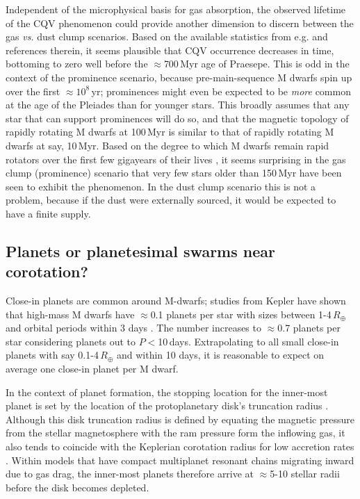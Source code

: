 \documentclass[11pt,twocolumn,tighten]{aastex63}
\begin{document}
Independent of the microphysical basis for gas absorption, the
observed lifetime of the CQV phenomenon could provide another
dimension to discern between the gas {\it vs.} dust clump scenarios.
Based on the available statistics from e.g.
\citet{2022AJ....164...80R} and references therein, it seems plausible
that CQV occurrence decreases in time, bottoming to zero well before
the $\approx$700\,Myr age of Praesepe.  This is odd in the context of
the prominence scenario, because pre-main-sequence M dwarfs spin up
over the first $\approx$$10^8$\,yr; prominences might even be expected
to be {\it more} common at the age of the Pleiades than for younger
stars.  This broadly assumes that any star that can support
prominences will do so, and that the magnetic topology of rapidly
rotating M dwarfs at 100\,Myr is similar to that of rapidly rotating M
dwarfs at say, 10\,Myr.  Based on the degree to which M dwarfs remain
rapid rotators over the first few gigayears of their lives
\citep[e.g.][]{2022AJ....164...80R,2022ApJ...936..109P}, it seems
surprising in the gas clump (prominence) scenario that very few stars
older than 150\,Myr have been seen to exhibit the phenomenon.  In the
dust clump scenario this is not a problem, because if the dust were
externally sourced, it would be expected to have a finite supply.


\subsection{Planets or planetesimal swarms near corotation?}

Close-in planets are common around M-dwarfs; studies from Kepler have
shown that high-mass M  dwarfs have $\approx$0.1 planets per star with
sizes between 1-4\,$R_\oplus$ and orbital periods within 3 days
\citep{2015ApJ...807...45D}.  The number increases to $\approx$0.7
planets per star considering planets out to $P$$<$10\,days.
Extrapolating to all small close-in planets with say 0.1-4\,$R_\oplus$
and within 10 days, it is reasonable to expect on average one close-in
planet per M dwarf.

In the context of planet formation, the stopping location for the
inner-most planet is set by the location of the protoplanetary disk's
truncation radius \citep{2018haex.bookE.142I}.  Although this disk
truncation radius is defined by equating the magnetic pressure from
the stellar magnetosphere with the ram pressure form the inflowing
gas, it also tends to coincide with the Keplerian corotation radius
for low accretion rates
\citep{2016ARA&A..54..135H,2022MNRAS.510.5246L}.  Within models that
have compact multiplanet resonant chains migrating inward due to gas
drag, the inner-most planets therefore arrive at $\approx$5-10 stellar
radii before the disk becomes depleted.
\end{document}
